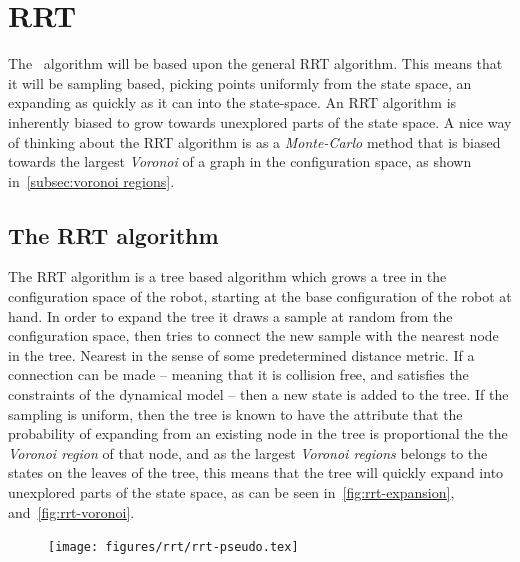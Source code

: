 \section{RRT}

The \rrtfunnel\ algorithm will be based upon the general \ac{RRT}
algorithm\cite[LaValle]{article}. This means that it will be sampling based,
picking points uniformly from the state space, an expanding as quickly as it can
into the state-space. An \ac{RRT} algorithm is inherently biased to grow towards
unexplored parts of the state space. A nice way of thinking about the \ac{RRT}
algorithm is as a \textit{Monte-Carlo} method that is biased towards the largest
\textit{Voronoi} of a graph in the configuration space, as shown
in~\ref{subsec:voronoi regions}. 

\subsection{The RRT algorithm}

The \ac{RRT} algorithm is a tree based algorithm which grows a tree in the
configuration space of the robot, starting at the base configuration of the
robot at hand. In order to expand the tree it draws a sample at random from the
configuration space, then tries to connect the new sample with the nearest node
in the tree. Nearest in the sense of some predetermined distance metric. If a
connection can be made -- meaning that it is collision free, and satisfies the
constraints of the dynamical model -- then a new state is added to the tree. If
the sampling is uniform, then the tree is known to have the attribute that the
probability of expanding from an existing node in the tree is proportional the
the \textit{Voronoi region} of that node, and as the largest \textit{Voronoi
  regions} belongs to the states on the leaves of the tree, this means that the
tree will quickly expand into unexplored parts of the state space, as can be
seen in~\ref{fig:rrt-expansion}, and~\ref{fig:rrt-voronoi}.

\begin{figure}
  \texttt{[image: figures/rrt/rrt-pseudo.tex]}
\end{figure}

